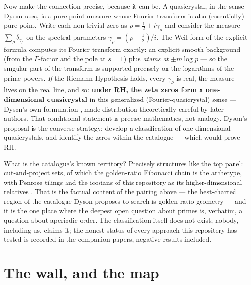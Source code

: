 \documentclass[11pt]{article}
\begin{document}
Now make the connection precise, because it can be. A quasicrystal, in
the sense Dyson uses, is a pure point measure whose Fourier transform is
also (essentially) pure point. Write each non-trivial zero as
$\rho=\tfrac12+i\gamma_\rho$ and consider the measure
$\sum_{\rho}\delta_{\gamma_\rho}$ on the spectral parameters
$\gamma_\rho=(\rho-\tfrac12)/i$. The Weil form of the explicit formula
computes its Fourier transform exactly: an explicit smooth background
(from the $\Gamma$-factor and the pole at $s=1$) plus \emph{atoms at}
$\pm m\log p$ --- so the singular part of the transform is supported
precisely on the logarithms of the prime powers. \emph{If} the Riemann
Hypothesis holds, every $\gamma_\rho$ is real, the measure lives on the
real line, and so: \textbf{under RH, the zeta zeros form a
one-dimensional quasicrystal} in this generalized
(Fourier-quasicrystal) sense --- Dyson's own formulation \cite{Dyson},
made distribution-theoretically careful by later authors. That
conditional statement is precise mathematics, not analogy. Dyson's
proposal is the converse strategy: develop a classification of
one-dimensional quasicrystals, and identify the zeros within the
catalogue --- which would prove RH.

What is the catalogue's known territory? Precisely structures like the
top panel: cut-and-project sets, of which the golden-ratio Fibonacci
chain is the archetype, with Penrose tilings and the icosians of this
repository as its higher-dimensional relatives \cite{BaakeGrimm}. That
is the factual content of the pairing above --- the best-charted region
of the catalogue Dyson proposes to search is golden-ratio geometry ---
and it is the one place where the deepest open question about primes is,
verbatim, a question about aperiodic order. The classification itself
does not exist; nobody, including us, claims it; the honest status of
every approach this repository has tested is recorded in the companion
papers, negative results included.

\section{The wall, and the map}
\end{document}
